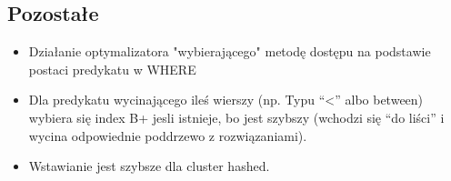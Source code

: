 \documentclass[a4paper,twoside]{article}
\begin{document}
  	\subsection*{Pozostałe}
  	\begin{itemize}
  		\item Działanie optymalizatora "wybierającego" metodę dostępu na podstawie postaci predykatu w WHERE
  		\item Dla predykatu wycinającego ileś wierszy (np. Typu “<” albo between) wybiera się index B+ jesli istnieje, bo jest szybszy (wchodzi się “do liści” i wycina odpowiednie poddrzewo z rozwiązaniami).
  		\item Wstawianie jest szybsze dla cluster hashed.
  	\end{itemize}
  	
  	
  	
  
\end{document}
